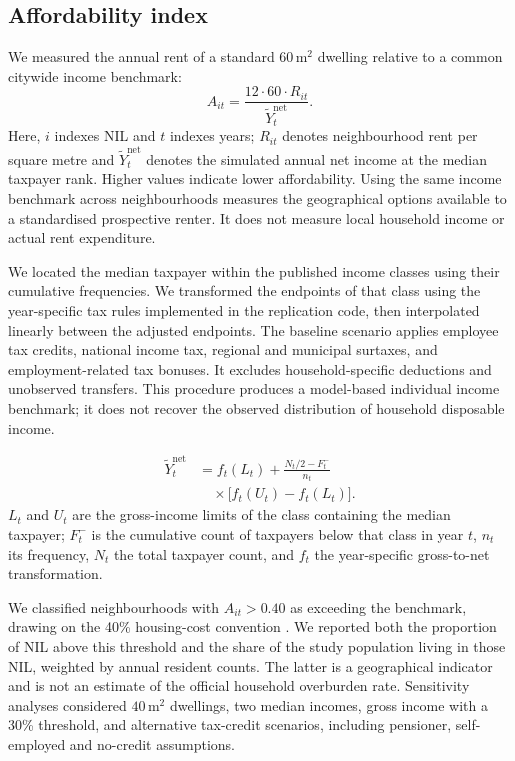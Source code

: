 \subsection*{Affordability index}
We measured the annual rent of a standard $60\,\mathrm{m}^2$ dwelling relative to a common citywide income benchmark:
\begin{equation}
A_{it}=\frac{12\cdot 60\cdot R_{it}}{\widetilde{Y}^{\mathrm{net}}_t}.
\label{eq:affordability}
\end{equation}
Here, $i$ indexes NIL and $t$ indexes years; $R_{it}$ denotes neighbourhood rent per square metre and $\widetilde{Y}^{\mathrm{net}}_t$ denotes the simulated annual net income at the median taxpayer rank. Higher values indicate lower affordability. Using the same income benchmark across neighbourhoods measures the geographical options available to a standardised prospective renter. It does not measure local household income or actual rent expenditure.

We located the median taxpayer within the published income classes using their cumulative frequencies. We transformed the endpoints of that class using the year-specific tax rules implemented in the replication code, then interpolated linearly between the adjusted endpoints. The baseline scenario applies employee tax credits, national income tax, regional and municipal surtaxes, and employment-related tax bonuses. It excludes household-specific deductions and unobserved transfers. This procedure produces a model-based individual income benchmark; it does not recover the observed distribution of household disposable income.

\begin{equation}
\begin{aligned}
\widetilde{Y}^{\mathrm{net}}_t
&= f_t(L_t)+\frac{N_t/2-F^{-}_t}{n_t}\\
&\quad\times\bigl[f_t(U_t)-f_t(L_t)\bigr].
\end{aligned}
\label{eq:net_median}
\end{equation}
$L_t$ and $U_t$ are the gross-income limits of the class containing the median taxpayer; $F^{-}_t$ is the cumulative count of taxpayers below that class in year $t$, $n_t$ its frequency, $N_t$ the total taxpayer count, and $f_t$ the year-specific gross-to-net transformation.

We classified neighbourhoods with $A_{it}>0.40$ as exceeding the benchmark, drawing on the 40\% housing-cost convention \cite{oecd_housing}. We reported both the proportion of NIL above this threshold and the share of the study population living in those NIL, weighted by annual resident counts. The latter is a geographical indicator and is not an estimate of the official household overburden rate. Sensitivity analyses considered $40\,\mathrm{m}^2$ dwellings, two median incomes, gross income with a 30\% threshold, and alternative tax-credit scenarios, including pensioner, self-employed and no-credit assumptions.

